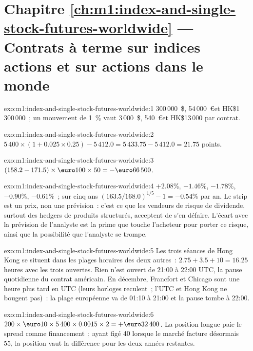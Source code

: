 \section*{Chapitre \ref{ch:m1:index-and-single-stock-futures-worldwide} --- Contrats à terme sur indices actions et sur actions dans le monde}

\begin{solution}{exo:m1:index-and-single-stock-futures-worldwide:1}
300\,000~\$, 54\,000~\euro et HK\$1\,300\,000~; un mouvement de 1~\% vaut 3\,000~\$, 540~\euro et
HK\$13\,000 par contrat.
\end{solution}

\begin{solution}{exo:m1:index-and-single-stock-futures-worldwide:2}
$5\,400 \times (1 + 0.025 \times 0.25) - 5\,412.0 = 5\,433.75 - 5\,412.0 = 21.75$
points.
\end{solution}

\begin{solution}{exo:m1:index-and-single-stock-futures-worldwide:3}
$(158.2 - 171.5) \times \text{\euro}100 \times 50 = -\text{\euro}66\,500$.
\end{solution}

\begin{solution}{exo:m1:index-and-single-stock-futures-worldwide:4}
$+2.08\%$, $-1.46\%$, $-1.78\%$, $-0.90\%$, $-0.61\%$~; sur cinq ans
$(163.5/168.0)^{1/5} - 1 = -0.54\%$ par an. Le strip est un prix, non une
prévision~: c'est ce que les vendeurs de risque de dividende, surtout des hedgers de
produits structurés, acceptent de s'en défaire. L'écart avec la
prévision de l'analyste est la prime que touche l'acheteur pour porter ce risque, ainsi que la
possibilité que l'analyste se trompe.
\end{solution}

\begin{solution}{exo:m1:index-and-single-stock-futures-worldwide:5}
Les trois séances de Hong Kong se situent dans les plages horaires des deux autres~: $2.75 + 3.5
+ 10 = 16.25$ heures avec les trois ouvertes. Rien n'est ouvert de 21:00 à 22:00
UTC, la pause quotidienne du contrat américain. En décembre, Francfort et Chicago
sont une heure plus tard en UTC (leurs horloges reculent~; l'UTC et Hong Kong ne
bougent pas)~: la plage européenne va de 01:10 à 21:00 et la pause tombe à
22:00.
\end{solution}

\begin{solution}{exo:m1:index-and-single-stock-futures-worldwide:6}
$200 \times \text{\euro}10 \times 5\,400 \times 0.0015 \times 2 =
+\text{\euro}32\,400$. La position longue paie le spread comme financement~; ayant figé 40
lorsque le marché facture désormais 55, la position vaut la différence pour
les deux années restantes.
\end{solution}

